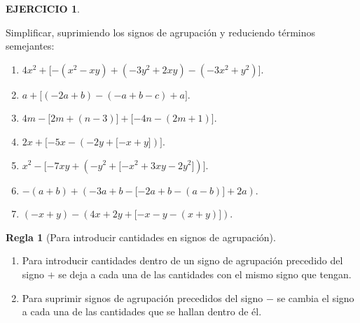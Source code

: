 \documentclass[12pt,letterpaper]{article}
\theoremstyle{definition}
\newtheorem{reg}{Regla}
\newtheorem{ejer}{EJERCICIO}
\begin{document}
\begin{ejer}\

Simplificar, suprimiendo los signos de agrupación y reduciendo términos semejantes:
\begin{enumerate}
\setlength{\itemindent}{+1in}
\item $4x^2+\lbrack-(x^2-xy)+(-3y^2+2xy)-(-3x^2+y^2)\rbrack$. 
\item $a+\lbrack(-2a+b)-(-a+b-c)+a\rbrack$.
\item $4m-\lbrack2m+(n-3)\rbrack+\lbrack-4n-(2m+1)\rbrack$.
\item $2x+\lbrack-5x-(-2y+\lbrack-x+y\rbrack)\rbrack$.
\item $x^2-\lbrack-7xy+(-y^2+\lbrack-x^2+3xy-2y^2\rbrack)\rbrack$.
\item $-(a+b)+(-3a+b-\lbrack-2a+b-(a-b)\rbrack+2a)$.
\item $(-x+y)-(4x+2y+\lbrack-x-y-(x+y)\rbrack)$. 
\end{enumerate}

\end{ejer}

\vspace{4mm}

\begin{reg}[Para introducir cantidades en signos de agrupación] \ 
\begin{enumerate}
\item Para introducir cantidades dentro de un signo de agrupación precedido del signo $+$ se deja a cada una de las cantidades con el mismo signo que tengan.
\item Para suprimir signos de agrupación precedidos del signo $-$ se cambia el signo a cada una de las cantidades que se hallan dentro de él.
\end{enumerate}
\end{reg}
\end{document}
